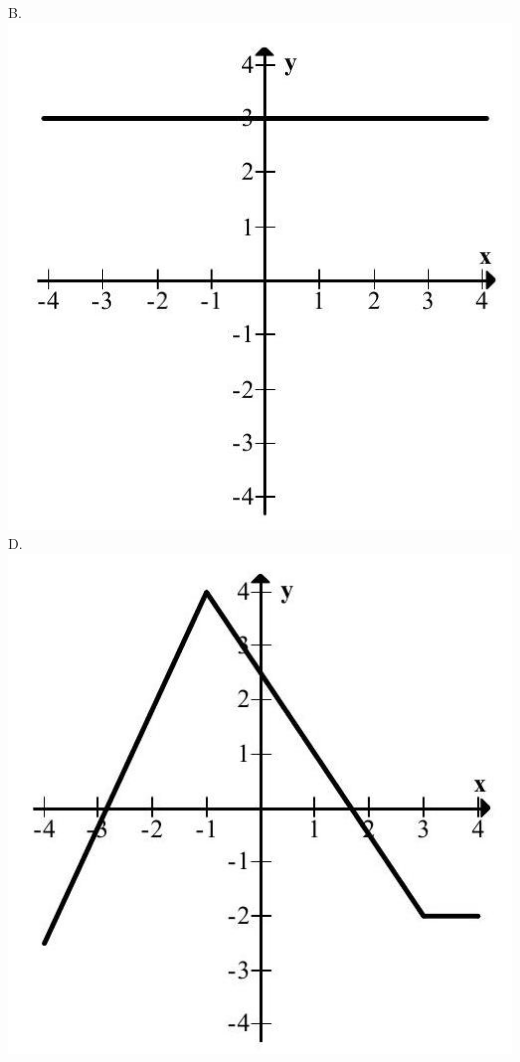 \documentclass[10pt]{article}
\begin{document}
B.\\
\includegraphics[max width=\textwidth, center]{2024_11_21_dcf819de2d2eef051a0dg-04(2)}\\
D.\\
\includegraphics[max width=\textwidth, center]{2024_11_21_dcf819de2d2eef051a0dg-04(3)}
\end{document}
